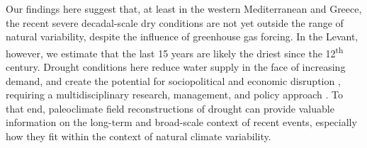 \documentclass[draft,jgr]{AGUTeX}
\begin{document}
\begin{article}
\indent Our findings here suggest that, at least in the western Mediterranean and Greece, the recent severe decadal-scale dry conditions are not yet outside the range of natural variability, despite the influence of greenhouse gas forcing. In the Levant, however, we estimate that the last 15 years are likely the driest since the 12\textsuperscript{th} century. Drought conditions here reduce water supply in the face of increasing demand, and create the potential for sociopolitical and economic disruption \citep[e.g.][]{Gleick2014,Kelley2015}, requiring a multidisciplinary research, management, and policy approach \citep{SolhvanGinkel2014}. To that end, paleoclimate field reconstructions of drought can provide valuable information on the long-term and broad-scale context of recent events, especially how they fit within the context of natural climate variability.









%
%
%


\end{article}
\end{document}
